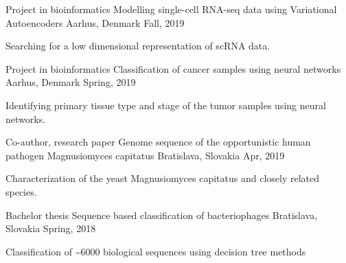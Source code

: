 
\begin{cventries}

  \cventry
    {Project in bioinformatics} %
    {Modelling single-cell RNA-seq data using Variational Autoencoders} %
    {Aarhus, Denmark} %
    {Fall, 2019} %
    {
      \begin{cvitems} %
        \item {Searching for a low dimensional representation of scRNA data.}
      \end{cvitems}
    }

  \cventry
    {Project in bioinformatics} %
    {Classification of cancer samples using neural networks} %
    {Aarhus, Denmark} %
    {Spring, 2019} %
    {
      \begin{cvitems} %
        \item {Identifying primary tissue type and stage of the tumor samples using neural networks.}
      \end{cvitems}
    }

  \cventry
    {Co-author, research paper} %
    {Genome sequence of the opportunistic human pathogen Magnusiomyces capitatus} %
    {Bratislava, Slovakia} %
    {Apr, 2019} %
    {
      \begin{cvitems} %
        \item {Characterization of the yeast Magnusiomyces capitatus and closely related species.}
      \end{cvitems}
    }

  \cventry
    {Bachelor thesis} %
    {Sequence based classification of bacteriophages} %
    {Bratislava, Slovakia} %
    {Spring, 2018} %
    {
      \begin{cvitems} %
        \item {Classification of \textasciitilde 6000 biological sequences using decision tree methods}
      \end{cvitems}
    }


\end{cventries}
